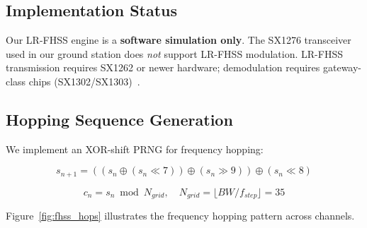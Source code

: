 \documentclass[11pt,a4paper]{article}
\begin{document}
\subsection{Implementation Status}

Our LR-FHSS engine is a \textbf{software simulation only}. The SX1276 transceiver used in our ground station does \emph{not} support LR-FHSS modulation. LR-FHSS transmission requires SX1262 or newer hardware; demodulation requires gateway-class chips (SX1302/SX1303)~\cite{semtech_lrfhss}.

\subsection{Hopping Sequence Generation}

We implement an XOR-shift PRNG for frequency hopping:

\begin{equation}
s_{n+1} = ((s_n \oplus (s_n \ll 7)) \oplus (s_n \gg 9)) \oplus (s_n \ll 8)
\end{equation}

\begin{equation}
c_n = s_n \bmod N_{grid}, \quad N_{grid} = \lfloor BW / f_{step} \rfloor = 35
\end{equation}

Figure~\ref{fig:fhss_hops} illustrates the frequency hopping pattern across channels.
\end{document}
